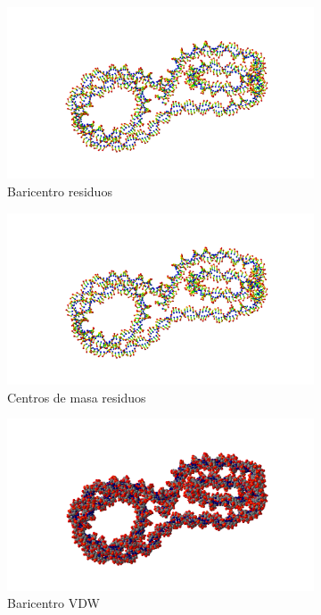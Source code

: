 \begin{figure}
\centering
\begin{subfigure}{.5\textwidth}
  \centering
  \includegraphics[width=.78\linewidth]{./Figures/baresi.png}
  \caption{Baricentro residuos }
  \label{fig:sub11}
\end{subfigure}%
\begin{subfigure}{.5\textwidth}
  \centering
  \includegraphics[width=.78\linewidth]{./Figures/baresi.png}
  \caption{Centros de masa residuos}
  \label{fig:sub22}
\end{subfigure}
\begin{subfigure}{.5\textwidth}
  \centering
  \includegraphics[width=.78\linewidth]{./Figures/bavdw.png}
  \caption{Baricentro VDW}
  \label{fig:sub33}
\end{subfigure}%
\begin{subfigure}{.5\textwidth}

\end{subfigure}
\end{figure}
